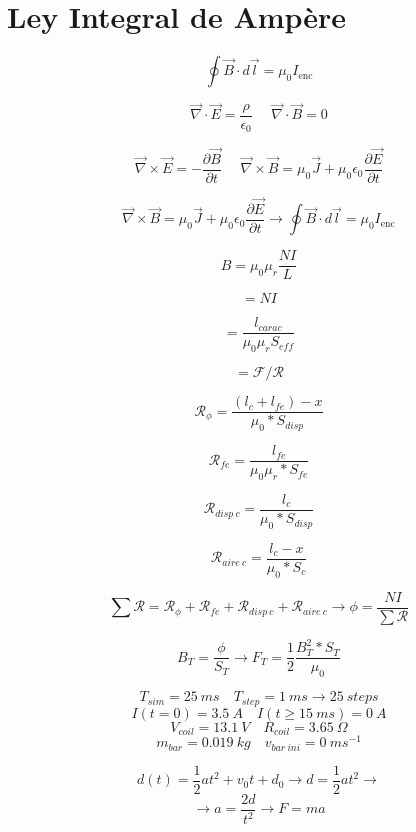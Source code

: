 \documentclass{article}
\begin{document}
\section*{Ley Integral de Ampère}

\huge
\[\oint \vec{B} \cdot d\vec{l} = \mu_0 I_{\text{enc}}\]

\[\vec{\nabla}\cdot \vec{E} = \frac{\rho}{\epsilon_0}~~~~~~\vec{\nabla}\cdot \vec{B} = 0\]

\[\vec{\nabla}\times\vec{E} = -\frac{\partial\vec{B}}{\partial t}~~~~~~\vec{\nabla}\times \vec{B} = \mu_0\vec{J}+\mu_0\epsilon_0\frac{\partial \vec{E}}{\partial t}\]


\[\vec{\nabla}\times \vec{B} = \mu_0\vec{J}+\mu_0\epsilon_0\frac{\partial \vec{E}}{\partial t} \rightarrow \oint \vec{B} \cdot d\vec{l} = \mu_0 I_{\text{enc}}\]


\[B = \mu_0\mu_r\frac{NI}{L}\]


\[=NI\]

\[=\frac{l_{carac}}{\mu_0\mu_r S_{eff}}\]

\[=\mathcal{F}/\mathcal{R}\]

\[\mathcal{R}_{\phi}=\frac{(l_c+l_{fe})-x}{\mu_0*S_{disp}}\]

\[\mathcal{R}_{fe}=\frac{l_{fe}}{\mu_0\mu_r*S_{fe}}\]

\[\mathcal{R}_{disp~c}=\frac{l_c}{\mu_0*S_{disp}}\]

\[\mathcal{R}_{aire~c}=\frac{l_c-x}{\mu_0*S_c}\]

\[\sum \mathcal{R}=\mathcal{R}_{\phi}+\mathcal{R}_{fe}+\mathcal{R}_{disp~c}+\mathcal{R}_{aire~c} \rightarrow \phi = \frac{NI}{\sum \mathcal{R}} \]

\[B_T=\frac{\phi}{S_T}\rightarrow F_T=\frac{1}{2}\frac{B_T^2*S_T}{\mu_0}\]

\[
T_{sim}=25~ms \quad T_{step}=1~ms \to 25~steps
\]
\[
I(t=0)=3.5~A \quad I(t\geq 15~ms)=0~A
\]
\[
V_{coil}=13.1~V \quad R_{coil}=3.65~\Omega
\]
\[
m_{bar}=0.019~kg \quad v_{bar~ini}=0~ms^{-1}
\]
\begin{flushleft}
    \[ d(t)=\frac{1}{2}at^2+v_0 t+d_0\rightarrow d = \frac{1}{2}at^2 \rightarrow \]
    \[\rightarrow a = \frac{2 d}{t^2} \rightarrow F=ma\]
\end{flushleft}
\end{document}
